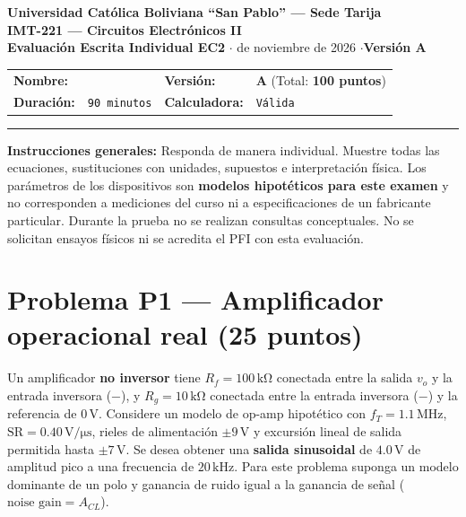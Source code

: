 \documentclass[10pt, a4paper]{article}
\begin{document}
\begin{center}
    {\large\textbf{\textcolor{ucbblue}{Universidad Católica Boliviana ``San Pablo'' --- Sede Tarija}}}\\[0.08cm]
    {\Large\textbf{IMT-221 --- Circuitos Electrónicos II}}\\
    {\normalsize\textbf{Evaluación Escrita Individual EC2} \quad$\cdot$ de noviembre de 2026 \quad$\cdot$\quad \textbf{Versión A}}
\end{center}

\begin{tcolorbox}[colback=neutralbg, colframe=ucbblue, boxrule=0.8pt, arc=1.5mm, left=6pt, right=6pt, top=5pt, bottom=5pt]
    \small
    \renewcommand{\arraystretch}{1.45}
    \begin{tabularx}{\textwidth}{@{}lX lX@{}}
        \textbf{Nombre:} & \hrulefill & \textbf{Versión:} & \textbf{A} \quad (Total: \textbf{100 puntos}) \\
        \textbf{Duración:} & \texttt{90 minutos} & \textbf{Calculadora:} & \texttt{Válida} \\
    \end{tabularx}
    \vspace{0.15cm}
    \hrule
    \vspace{0.15cm}
    \footnotesize
    \textbf{Instrucciones generales:} Responda de manera individual. Muestre todas las ecuaciones, sustituciones con unidades, supuestos e interpretación física. Los parámetros de los dispositivos son \textbf{modelos hipotéticos para este examen} y no corresponden a mediciones del curso ni a especificaciones de un fabricante particular. Durante la prueba no se realizan consultas conceptuales. No se solicitan ensayos físicos ni se acredita el PFI con esta evaluación.
\end{tcolorbox}

\section*{Problema P1 --- Amplificador operacional real (25 puntos)}

Un amplificador \textbf{no inversor} tiene $R_f = 100\,\mathrm{k\Omega}$ conectada entre la salida $v_o$ y la entrada inversora ($-$), y $R_g = 10\,\mathrm{k\Omega}$ conectada entre la entrada inversora ($-$) y la referencia de $0\,\mathrm{V}$. Considere un modelo de op-amp hipotético con $f_T = 1.1\,\mathrm{MHz}$, $\mathrm{SR} = 0.40\,\mathrm{V/\mu s}$, rieles de alimentación $\pm 9\,\mathrm{V}$ y excursión lineal de salida permitida hasta $\pm 7\,\mathrm{V}$. Se desea obtener una \textbf{salida sinusoidal} de $4.0\,\mathrm{V}$ de amplitud pico a una frecuencia de $20\,\mathrm{kHz}$. Para este problema suponga un modelo dominante de un polo y ganancia de ruido igual a la ganancia de señal ($\text{noise gain} = A_{CL}$).
\end{document}

